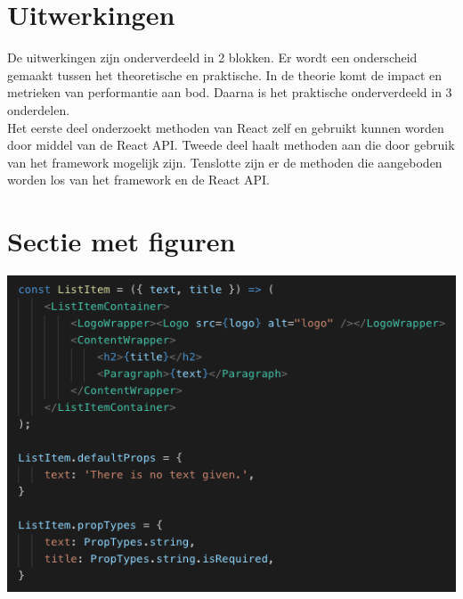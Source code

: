 \documentclass[a0,portrait]{a0poster}
\begin{document}
\begin{multicols}{2}

\color{Black} %
\color{HoGentAccent1} 
\section*{Uitwerkingen}
\color{black}

De uitwerkingen zijn onderverdeeld in 2 blokken. Er wordt een onderscheid gemaakt tussen het theoretische en praktische. In de theorie komt de impact en metrieken van performantie aan bod. Daarna is het praktische onderverdeeld in 3 onderdelen. \\
Het eerste deel onderzoekt methoden van React zelf en gebruikt kunnen worden door middel van de React API. Tweede deel haalt methoden aan die door gebruik van het framework mogelijk zijn. Tenslotte zijn er de methoden die aangeboden worden los van het framework en de React API.

\color{HoGentAccent1} 
\section*{Sectie met figuren}
\color{black}

\begin{center}\vspace{1cm}
    \includegraphics[width=1.0\linewidth]{ComponentWithProps}
\end{center}\vspace{1cm}


\end{multicols}
\end{document}
